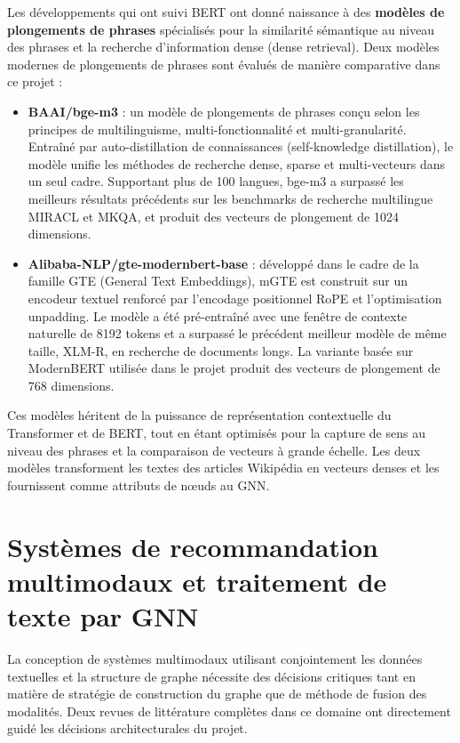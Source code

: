 Les développements qui ont suivi BERT ont donné naissance à des \textbf{modèles de plongements de phrases} spécialisés pour la similarité sémantique au niveau des phrases et la recherche d'information dense (dense retrieval). Deux modèles modernes de plongements de phrases sont évalués de manière comparative dans ce projet :
\begin{itemize}
    \item \textbf{BAAI/bge-m3} \cite{chen2025bgem3} : un modèle de plongements de phrases conçu selon les principes de multilinguisme, multi-fonctionnalité et multi-granularité. Entraîné par auto-distillation de connaissances (self-knowledge distillation), le modèle unifie les méthodes de recherche dense, sparse et multi-vecteurs dans un seul cadre. Supportant plus de 100 langues, bge-m3 a surpassé les meilleurs résultats précédents sur les benchmarks de recherche multilingue MIRACL et MKQA, et produit des vecteurs de plongement de 1024 dimensions.
    \item \textbf{Alibaba-NLP/gte-modernbert-base} \cite{zhang2024mgte} : développé dans le cadre de la famille GTE (General Text Embeddings), mGTE est construit sur un encodeur textuel renforcé par l'encodage positionnel RoPE et l'optimisation unpadding. Le modèle a été pré-entraîné avec une fenêtre de contexte naturelle de 8192 tokens et a surpassé le précédent meilleur modèle de même taille, XLM-R, en recherche de documents longs. La variante basée sur ModernBERT utilisée dans le projet produit des vecteurs de plongement de 768 dimensions.
\end{itemize}
Ces modèles héritent de la puissance de représentation contextuelle du Transformer et de BERT, tout en étant optimisés pour la capture de sens au niveau des phrases et la comparaison de vecteurs à grande échelle. Les deux modèles transforment les textes des articles Wikipédia en vecteurs denses et les fournissent comme attributs de n\oe uds au GNN.

\section{Systèmes de recommandation multimodaux et traitement de texte par GNN}

La conception de systèmes multimodaux utilisant conjointement les données textuelles et la structure de graphe nécessite des décisions critiques tant en matière de stratégie de construction du graphe que de méthode de fusion des modalités. Deux revues de littérature complètes dans ce domaine ont directement guidé les décisions architecturales du projet.

